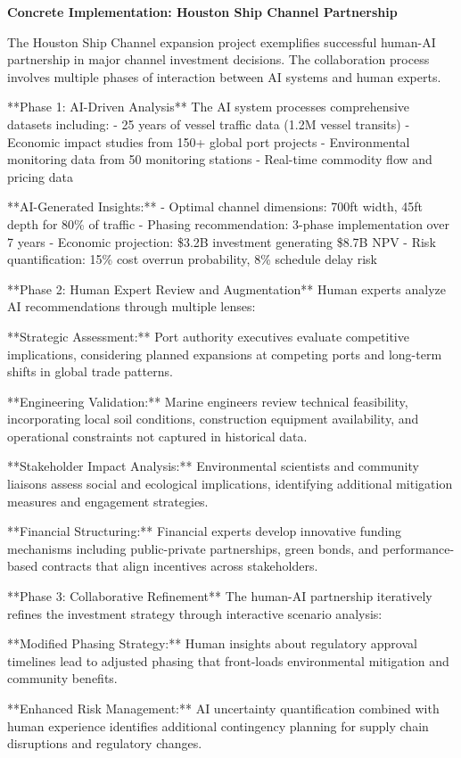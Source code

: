 \documentclass{article}
\begin{document}
\textbf{Concrete Implementation: Houston Ship Channel Partnership}

The Houston Ship Channel expansion project exemplifies successful human-AI partnership in major channel investment decisions. The collaboration process involves multiple phases of interaction between AI systems and human experts.

**Phase 1: AI-Driven Analysis**
The AI system processes comprehensive datasets including:
- 25 years of vessel traffic data (1.2M vessel transits)
- Economic impact studies from 150+ global port projects  
- Environmental monitoring data from 50 monitoring stations
- Real-time commodity flow and pricing data

**AI-Generated Insights:**
- Optimal channel dimensions: 700ft width, 45ft depth for 80\% of traffic
- Phasing recommendation: 3-phase implementation over 7 years
- Economic projection: \$3.2B investment generating \$8.7B NPV
- Risk quantification: 15\% cost overrun probability, 8\% schedule delay risk

**Phase 2: Human Expert Review and Augmentation**
Human experts analyze AI recommendations through multiple lenses:

**Strategic Assessment:** Port authority executives evaluate competitive implications, considering planned expansions at competing ports and long-term shifts in global trade patterns.

**Engineering Validation:** Marine engineers review technical feasibility, incorporating local soil conditions, construction equipment availability, and operational constraints not captured in historical data.

**Stakeholder Impact Analysis:** Environmental scientists and community liaisons assess social and ecological implications, identifying additional mitigation measures and engagement strategies.

**Financial Structuring:** Financial experts develop innovative funding mechanisms including public-private partnerships, green bonds, and performance-based contracts that align incentives across stakeholders.

**Phase 3: Collaborative Refinement**
The human-AI partnership iteratively refines the investment strategy through interactive scenario analysis:

**Modified Phasing Strategy:** Human insights about regulatory approval timelines lead to adjusted phasing that front-loads environmental mitigation and community benefits.

**Enhanced Risk Management:** AI uncertainty quantification combined with human experience identifies additional contingency planning for supply chain disruptions and regulatory changes.
\end{document}
